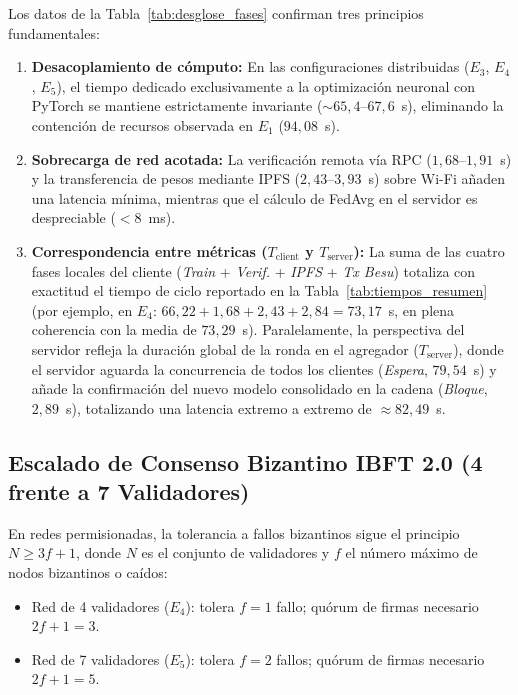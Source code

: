 Los datos de la Tabla~\ref{tab:desglose_fases} confirman tres principios fundamentales:
\begin{enumerate}
    \item \textbf{Desacoplamiento de cómputo:} En las configuraciones distribuidas ($E_3$, $E_4$, $E_5$), el tiempo dedicado exclusivamente a la optimización neuronal con PyTorch se mantiene estrictamente invariante ($\sim 65,4\text{--}67,6$~s), eliminando la contención de recursos observada en $E_1$ ($94,08$~s).
    \item \textbf{Sobrecarga de red acotada:} La verificación remota vía RPC ($1,68\text{--}1,91$~s) y la transferencia de pesos mediante IPFS ($2,43\text{--}3,93$~s) sobre Wi-Fi añaden una latencia mínima, mientras que el cálculo de FedAvg en el servidor es despreciable ($< 8$~ms).
    \item \textbf{Correspondencia entre métricas ($T_{\text{client}}$ y $T_{\text{server}}$):} La suma de las cuatro fases locales del cliente (\textit{Train} + \textit{Verif.} + \textit{IPFS} + \textit{Tx Besu}) totaliza con exactitud el tiempo de ciclo reportado en la Tabla~\ref{tab:tiempos_resumen} (por ejemplo, en $E_4$: $66{,}22 + 1{,}68 + 2{,}43 + 2{,}84 = 73{,}17$~s, en plena coherencia con la media de $73{,}29$~s). Paralelamente, la perspectiva del servidor refleja la duración global de la ronda en el agregador ($T_{\text{server}}$), donde el servidor aguarda la concurrencia de todos los clientes (\textit{Espera}, $79{,}54$~s) y añade la confirmación del nuevo modelo consolidado en la cadena (\textit{Bloque}, $2{,}89$~s), totalizando una latencia extremo a extremo de $\approx 82{,}49$~s.
\end{enumerate}

\subsection{Escalado de Consenso Bizantino IBFT 2.0 (4 frente a 7 Validadores)}
En redes permisionadas, la tolerancia a fallos bizantinos sigue el principio $N \ge 3f + 1$, donde $N$ es el conjunto de validadores y $f$ el número máximo de nodos bizantinos o caídos:
\begin{itemize}
    \item Red de 4 validadores ($E_4$): tolera $f=1$ fallo; quórum de firmas necesario $2f+1 = 3$.
    \item Red de 7 validadores ($E_5$): tolera $f=2$ fallos; quórum de firmas necesario $2f+1 = 5$.
\end{itemize}

